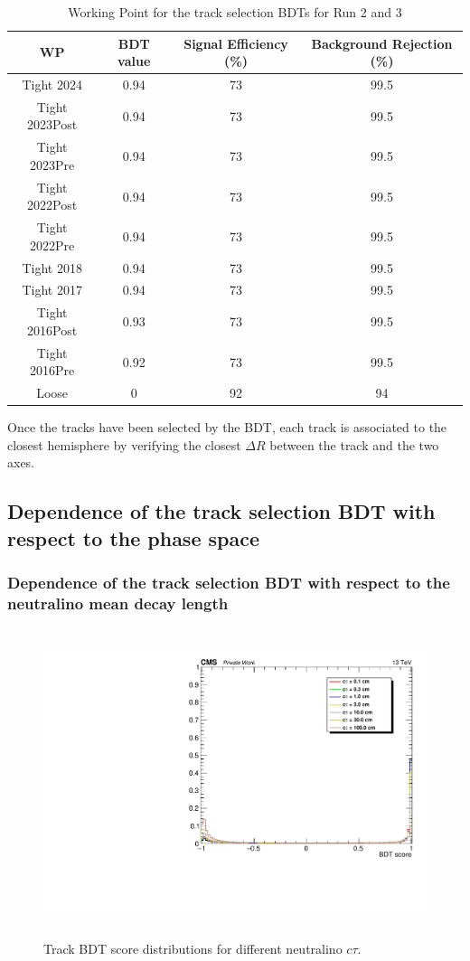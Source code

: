 \documentclass{cernatlasnote}
\begin{document}
        \begin{table}[h]
\centering
\begin{tabular}{|c|c|c|c|}
  \hline
  \rowcolor{lightgray} 
  WP & BDT value & Signal Efficiency (\%) & Background Rejection  (\%)\\
  \hline
      Tight 2024 & 0.94 & 73 & 99.5 \\
      Tight 2023Post & 0.94 & 73 & 99.5 \\
      Tight 2023Pre & 0.94 & 73 & 99.5 \\
      Tight 2022Post & 0.94 & 73 & 99.5 \\
      Tight 2022Pre & 0.94 & 73 & 99.5 \\
    Tight 2018 & 0.94 & 73 & 99.5 \\
    Tight 2017 & 0.94 & 73 & 99.5 \\
    Tight 2016Post & 0.93 & 73 & 99.5 \\
    Tight 2016Pre & 0.92 & 73 & 99.5 \\
    \hline
    Loose & 0 & 92 & 94 \\
  \hline
\end{tabular}
    \caption{Working Point for the track selection BDTs for Run 2 and 3}
    \label{tab:TRKBDTWP}
\end{table}

Once the tracks have been selected by the BDT, each track is associated to the closest hemisphere by verifying the closest $\Delta R$ between the track and the two axes.
\subsection{Dependence of the track selection BDT with respect to the phase space}
    \subsubsection{Dependence of the track selection BDT with respect to the neutralino mean decay length}
\begin{figure}[ht]
\centering
\includegraphics[height=9cm, width=12cm, trim= 0cm 0cm 0cm 0cm,clip]{images/TRKBDT/plot_BDTTRKvsctau.pdf}
\caption{\label{fig:BDTctau} Track BDT score distributions for different neutralino $c\tau$. }
\end{figure}
\end{document}
